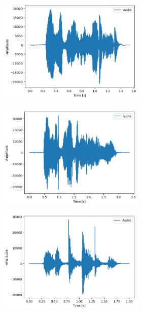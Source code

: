\documentclass[11pt]{article}
\begin{document}
\begin{figure}
\begin{subfigure}{.5\textwidth}
\begin{subfigure}{.18\textwidth}
  \includegraphics[width=\linewidth]{Bilder/art_happy.png}
  \label{fig:sfig2}
\end{subfigure}
\begin{subfigure}{.18\textwidth}
  \centering
  \includegraphics[width=\linewidth]{Bilder/art_sad.png}
  \label{fig:sfig2}
\end{subfigure}
\begin{subfigure}{.18\textwidth}
  \centering
  \includegraphics[width=\linewidth]{Bilder/art_fear.png}

\end{subfigure}
\end{subfigure}
\end{figure}
\end{document}
